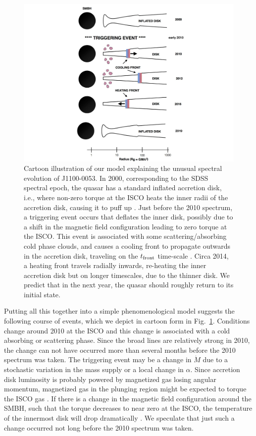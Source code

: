 \documentclass[a4paper,fleqn,usenatbib]{mnras}
\begin{document}
\begin{figure}
  \includegraphics[width=15.4cm, trim=0.0cm 0.0cm 0.0cm 0.0cm, clip]
  {../plots/models/cartoon_v4.pdf}
  \centering
  \caption[]{
    Cartoon illustration of our model explaining the unusual spectral
evolution of J1100-0053. In 2000, corresponding to the SDSS spectral
epoch, the quasar has a standard inflated accretion disk, i.e., where
non-zero torque at the ISCO heats the inner radii of the accretion
disk, causing it to puff up \citep[e.g.,][]{Zimmerman2005}. Just
before the 2010 spectrum, a triggering event occurs that deflates the
inner disk, possibly due to a shift in the magnetic field
configuration leading to zero torque at the ISCO.  This event is
associated with some scattering/absorbing cold phase clouds, and
causes a cooling front to propagate outwards in the accretion disk,
traveling on the $t_{\rm front}$ time-scale \citep[see
also][]{Hameury2009}.  Circa 2014, a heating front travels radially
inwards, re-heating the inner accretion disk but on longer timescales,
due to the thinner disk. We predict that in the next year, the quasar
should roughly return to its initial state.}
  \label{fig:J110057_cartoon}
\end{figure}
Putting all this together into a simple phenomenological model
suggests the following course of events, which we depict in cartoon
form in Fig.~\ref{fig:J110057_cartoon}.  Conditions change around 2010
at the ISCO and this change is associated with a cold absorbing or
scattering phase. Since the broad lines are relatively strong in 2010,
the change can not have occurred more than several months before the
2010 spectrum was taken. The triggering event may be a change in
$\dot{M}$ due to a stochastic variation in the mass supply or a local
change in $\alpha$. Since accretion disk luminosity is probably
powered by magnetized gas losing angular momentum, magnetized gas in
the plunging region might be expected to torque the ISCO gas
\citep[e.g., ][]{Gammie1999, Agol_Krolik2000}. If there is a change in
the magnetic field configuration around the SMBH, such that the torque
decreases to near zero at the ISCO, the temperature of the innermost disk will
drop dramatically \citep{Cao2003}.  We speculate that just such a
change occurred not long before the 2010 spectrum was taken.
\end{document}
